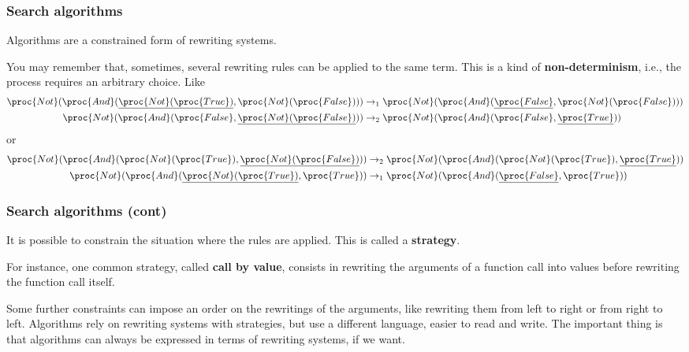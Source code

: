 
%
\begin{frame}
\frametitle{Search algorithms}

Algorithms are a constrained form of rewriting systems.

\bigskip

You may remember that, sometimes, several rewriting rules can be
applied to the same term. This is a kind of \textbf{non-determinism},
i.e., the process requires an arbitrary choice. Like
{\footnotesize
\begin{align*}
  \proc{Not} (\proc{And} (\underline{\proc{Not} (\proc{True})},
  \proc{Not} (\proc{False})))
&\rightarrow_1 \proc{Not} (\proc{And} (\underline{\proc{False}},
  \proc{Not} (\proc{False})))\\
  \proc{Not} (\proc{And} (\proc{False}, \underline{\proc{Not}
  (\proc{False})}))
&\rightarrow_2 \proc{Not} (\proc{And} (\proc{False},
  \underline{\proc{True}}))
\end{align*}
}
or
{\footnotesize
\begin{align*}
  \proc{Not} (\proc{And} (\proc{Not} (\proc{True}),
  \underline{\proc{Not} (\proc{False})}))
&\rightarrow_2 \proc{Not} (\proc{And} (\proc{Not} (\proc{True}),
  \underline{\proc{True}}))\\
  \proc{Not} (\proc{And} (\underline{\proc{Not} (\proc{True})},
  \proc{True}))
&\rightarrow_1 \proc{Not} (\proc{And} (\underline{\proc{False}},
  \proc{True}))
\end{align*}
}

\end{frame}

%
\begin{frame}
\frametitle{Search algorithms (cont)}

It is possible to constrain the situation where the rules are
applied. This is called a \textbf{strategy}. 

\bigskip

For instance, one common strategy, called \textbf{call by value},
consists in rewriting the arguments of a function call into values
before rewriting the function call itself. 

\bigskip

Some further constraints can impose an order on the rewritings of the
arguments, like rewriting them from left to right or from right to
left. Algorithms rely on rewriting systems with strategies, but use a
different language, easier to read and write. The important thing is
that algorithms can always be expressed in terms of rewriting systems,
if we want.

\end{frame}


